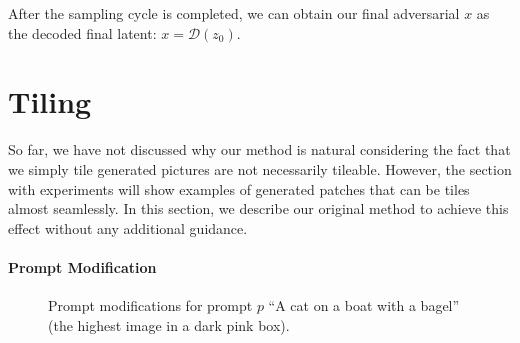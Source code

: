 After the sampling cycle is completed, we can obtain our final adversarial $x$ as the decoded final latent: $x = \mathcal{D}(z_0)$.

\section{Tiling}

So far, we have not discussed why our method is natural considering the fact that we simply tile generated pictures are not necessarily tileable.
However, the section with experiments will show examples of generated patches that can be tiles almost seamlessly.
In this section, we describe our original method to achieve this effect without any additional guidance.

\paragraph{Prompt Modification}

\begin{figure}[htp]
\hfill
{}
\caption{Prompt modifications for prompt $p$ ``A cat on a boat with a bagel'' (the highest image in a dark pink box).}
\end{figure}

